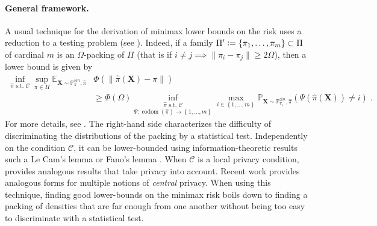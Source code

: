 \documentclass[10pt]{article} %
\newcommand{\Prob}[0]{\mathbb{P}}
\newcommand{\E}[0]{\mathbb{E}}
\newcommand{\eqdef}{\vcentcolon=}
\newcommand\mech[1]{\mathfrak{#1}}
\newcommand\vect[1]{\mathbf{#1}}
\newcommand\codom[1]{\operatorname{codom}\left({#1}\right)}
\newcommand\intslice[2]{\left\{ {#1}, \dots,  {#2} \right\}}
\newcommand\p[1]{\left( {#1}\right)}
\newcommand\RG[1]{\textcolor{red}{#1}}
\newcommand\mRG[1]{\marginpar{\tiny\RG{#1}}}
\newcommand\CL[1]{\textcolor{blue}{#1}}
\newcommand\B[1]{{#1}}
\begin{document}
\paragraph{General framework.}
A usual technique for the derivation of minimax lower bounds on the risk uses a reduction to a testing problem (see \citet{tsybakov2003introduction}). Indeed, if a family $\Pi' \eqdef \{ \pi_1, \dots, \pi_m\} \subset \Pi$ of cardinal $m$ is an $\Omega$-packing of %
$\Pi$ (that is
if $i \neq j \implies \|\pi_i - \pi_j \| \geq 2 \Omega$), then
a lower bound is given by %
\begin{equation}
\label{jkhgqskdjhfbgkjqhwgsdkfjhgkqwsjhdgfjkhwsgdb}
\begin{aligned}
    \inf_{\hat{\pi} \text{ s.t. } \mathcal{C}} \sup_{\pi \in \Pi}  \E_{\vect{X} \sim \Prob_{\pi}^{\otimes n}, \hat{\pi}} &\Phi(\|\hat{\pi}(\vect{X}) - \pi \|) \\
    &\geq 
    \Phi(\Omega) \underset{\Psi : \codom{\hat{\pi}} \rightarrow\intslice{1}{m}}{\inf_{\hat{\pi} \text{ s.t. } \mathcal{C}}}  \max_{i \in \intslice{1}{m}} \Prob_{\mathbf{X} \sim \Prob_{\pi_i}^{\otimes n},\hat{\pi}} \p{ \Psi \p{\hat{\pi}(\vect{X})} \neq i}\;.
\end{aligned}
\end{equation}
For more details, see \citet{duchi2018minimax,acharya2021differentially,lalanne2022statistical}. The right-hand side characterizes the difficulty of discriminating the distributions of the packing by a statistical test. Independently on the condition $\mathcal{C}$, it can be lower-bounded using information-theoretic results such a Le Cam's lemma \citep[Lemma 5.3]{rigollet2015high} or Fano's lemma \citep[Theorem 3.1]{giraud2021introduction}. When $\mathcal{C}$ is a local privacy condition, \citet{duchi2018minimax} provides analogous results that take privacy into account. Recent work \citep{acharya2021differentially,kamath2022improved,lalanne2022statistical} provides analogous forms for multiple notions of \emph{\B{central}} privacy. When using this technique, finding good lower-bounds on the minimax risk boils down to finding a packing of densities that are far enough from one another without being too easy to discriminate with a statistical test.
\end{document}
